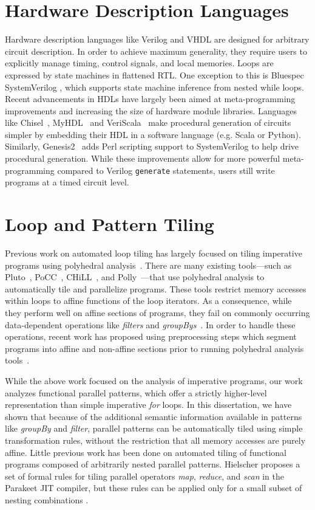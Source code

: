 \section{Hardware Description Languages}
Hardware description languages like Verilog and VHDL are designed for arbitrary circuit description. In order to achieve maximum generality, they require users to explicitly manage timing, control signals, and local memories. Loops are expressed by state machines in flattened RTL.
One exception to this is Bluespec SystemVerilog \cite{bluespec}, which supports state machine inference from nested while loops.
Recent advancements in HDLs have largely been aimed at meta-programming improvements and increasing the size of hardware module libraries.
Languages like Chisel~\cite{chisel}, MyHDL~\cite{myhdl} and VeriScala~\cite{veriscala} make procedural generation of circuits simpler by embedding their HDL in a software language (e.g. Scala or Python). Similarly, Genesis2~\cite{genesis2} adds Perl scripting support to SystemVerilog to help drive procedural generation. While these improvements allow for more powerful meta-programming compared to Verilog \texttt{\small{generate}} statements, users still write programs at a timed circuit level.

\section{Loop and Pattern Tiling}
Previous work on automated loop tiling has largely focused on tiling imperative programs
using polyhedral analysis~\cite{bondhugula08,pouchet10phd}.
There are many existing tools---such as Pluto~\cite{pluto08pldi},
PoCC~\cite{pouchet11popl}, CHiLL~\cite{chen2008chill},
and Polly~\cite{grosser2012polly}---that use polyhedral analysis
to automatically tile and parallelize programs.  These tools restrict memory
accesses within loops to affine functions of the loop iterators.
As a consequence, while they perform well on affine sections of programs,
they fail on commonly occurring data-dependent operations
like \emph{filters} and \emph{groupBys}~\cite{benabderrahmane10cc}. In order to handle these operations,
recent work has proposed using preprocessing steps which segment programs into affine
and non-affine sections prior to running polyhedral analysis tools~\cite{venkat}.

While the above work focused on the analysis of imperative programs, our work
analyzes functional parallel patterns, which offer a strictly higher-level representation
than simple imperative \emph{for} loops.
In this dissertation, we have shown that because of the additional semantic information
available in patterns like \emph{groupBy} and \emph{filter},
parallel patterns can be automatically tiled using
simple transformation rules, without the restriction that all memory accesses
are purely affine.
Little previous work has been done on automated tiling of functional
programs composed of arbitrarily nested parallel patterns.
Hielscher proposes a set of formal rules for tiling parallel operators \emph{map}, \emph{reduce}, and \emph{scan}
in the Parakeet JIT compiler, but these rules can be applied only for a small subset of nesting combinations \cite{parakeet}.

